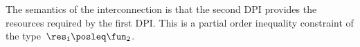 


The semantics of the interconnection is that the second DPI provides the resources required by the first DPI.
This is a partial order inequality constraint of the type~$\res_{1}\posleq\fun_{2}$.


